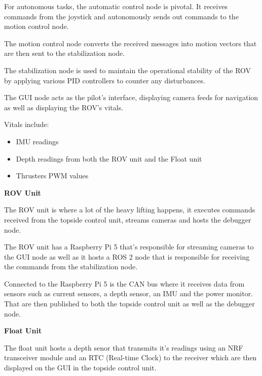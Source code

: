 \hspace{10pt} For autonomous tasks, the automatic control node is pivotal. It receives commands from the joystick and autonomously sends out commands to the motion control node.

\hspace{10pt} The motion control node converts the received messages into motion vectors that are then sent to the stabilization node.

\hspace{10pt} The stabilization node is used to maintain the operational stability of the ROV by applying various PID controllers to counter any disturbances.

\hspace{10pt} The GUI node acts as the pilot's interface, displaying camera feeds for navigation as well as displaying the ROV's vitals.

Vitals include: 
\vspace{-0.3\baselineskip}
\begin{itemize}
    \setlength{\itemsep}{0pt}
    \item IMU readings
    \item Depth readings from both the ROV unit and the Float unit
    \item Thrusters PWM values
\end{itemize}

\vspace{0.2cm}
\textbf{ROV Unit}

The ROV unit is where a lot of the heavy lifting happens, it executes commands received from the topside control unit, streams cameras and hosts the debugger node.

The ROV unit has a Raspberry Pi 5 that's responsible for streaming cameras to the GUI node as well as it hosts a ROS 2 node that is responsible for receiving the commands from the stabilization node.

Connected to the Raspberry Pi 5 is the CAN bus where it receives data from sensors such as current sensors, a depth sensor, an IMU and the power monitor.
That are then published to both the topside control unit as well as the debugger node.

\vspace{0.2cm}
\textbf{Float Unit}

The float unit hosts a depth senor that transmits it's readings using an NRF transceiver module and an RTC (Real-time Clock) to the receiver which are then displayed on the GUI in the topside control unit.

